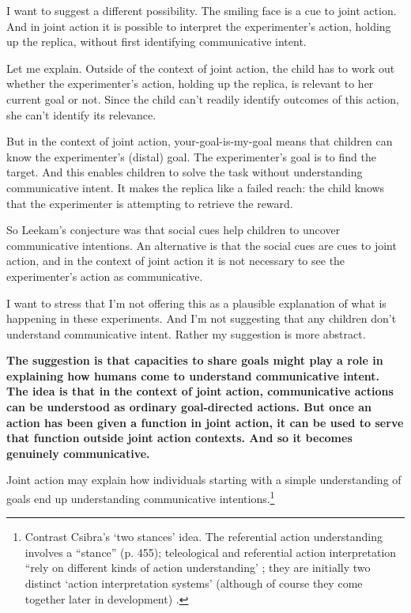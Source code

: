 \documentclass[14pt,a4paper]{extarticle}
\begin{document}
I want to suggest a different possibility.  The smiling face is a cue to joint action.  And in joint action it is possible to interpret the experimenter's action, holding up the replica, without first identifying communicative intent.

Let me explain.  Outside of the context of joint action, the child has to work out whether the experimenter's action, holding up the replica, is relevant to her current goal or not.  Since the child can't readily identify outcomes of this action, she can't identify its relevance.

But in the context of joint action, your-goal-is-my-goal means that children can know the experimenter's (distal) goal.
The experimenter's goal is to find the target.
And this enables children to solve the task without understanding communicative intent.  
It makes the replica like a failed reach: the child knows that the experimenter is attempting to retrieve the reward.

So Leekam's conjecture was that social cues help children to uncover communicative intentions.
An alternative is that the social cues are cues to joint action, and in the context of joint action it is not necessary to see the experimenter's action as communicative.

I want to stress that I'm not offering this as a plausible explanation of what is happening in these experiments.  And I'm not suggesting that any children don't understand communicative intent.  Rather my suggestion is more abstract.

\textbf{The suggestion is that capacities to share goals might play a role in explaining how humans come to understand communicative intent.
The idea is that in the context of joint action, communicative actions can be understood as ordinary goal-directed actions.
But once an action has been given a function in joint action, it can be used to serve that function outside joint action contexts.  And so it becomes genuinely communicative.}

Joint action may explain how individuals starting with a simple understanding of goals end up understanding communicative intentions.\footnote{
Contrast Csibra's `two stances' idea. The referential action understanding involves a “stance” (p. 455); teleological and referential action interpretation “rely on different kinds of action understanding' \citep[p.\ 456]{Csibra:2003kp}; they are initially two distinct `action interpretation systems' (although of course they come together later in development)  \citep[p.\ 456]{Csibra:2003kp}.
} 
\end{document}
